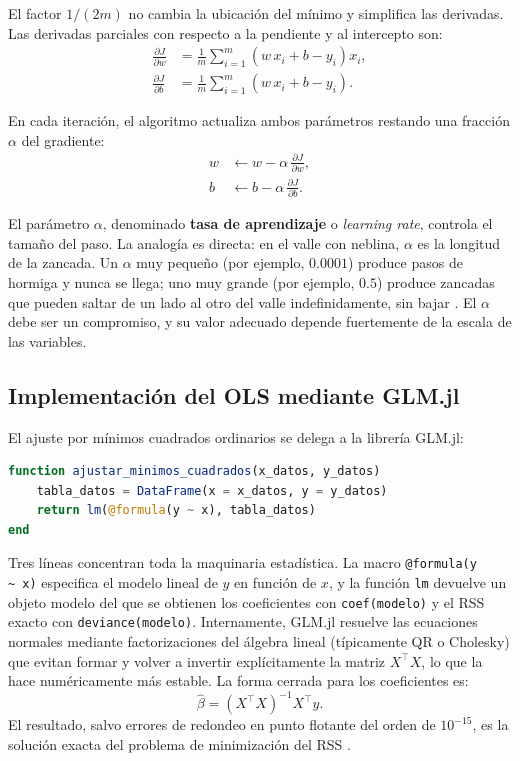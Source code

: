 \documentclass[11pt,a4paper]{article}
\begin{document}
El factor $1/(2m)$ no cambia la ubicación del mínimo y simplifica las derivadas. Las derivadas parciales con respecto a la pendiente y al intercepto son:
\begin{align}
\frac{\partial J}{\partial w} &= \frac{1}{m} \sum_{i=1}^{m} \left( w\,x_i + b - y_i \right) x_i, \\
\frac{\partial J}{\partial b} &= \frac{1}{m} \sum_{i=1}^{m} \left( w\,x_i + b - y_i \right).
\end{align}

En cada iteración, el algoritmo actualiza ambos parámetros restando una fracción $\alpha$ del gradiente:
\begin{align}
w &\leftarrow w - \alpha\,\frac{\partial J}{\partial w}, \\
b &\leftarrow b - \alpha\,\frac{\partial J}{\partial b}.
\end{align}

El parámetro $\alpha$, denominado \textbf{tasa de aprendizaje} o \textit{learning rate}, controla el tamaño del paso. La analogía es directa: en el valle con neblina, $\alpha$ es la longitud de la zancada. Un $\alpha$ muy pequeño (por ejemplo, $0.0001$) produce pasos de hormiga y nunca se llega; uno muy grande (por ejemplo, $0.5$) produce zancadas que pueden saltar de un lado al otro del valle indefinidamente, sin bajar \cite{codificando_lineal,ibm_gd}. El $\alpha$ debe ser un compromiso, y su valor adecuado depende fuertemente de la escala de las variables.

\subsection{Implementación del OLS mediante GLM.jl}

El ajuste por mínimos cuadrados ordinarios se delega a la librería GLM.jl:

\begin{lstlisting}[language=Julia,caption={Ajuste OLS mediante la macro @formula y la función lm de GLM.jl.}]
function ajustar_minimos_cuadrados(x_datos, y_datos)
    tabla_datos = DataFrame(x = x_datos, y = y_datos)
    return lm(@formula(y ~ x), tabla_datos)
end
\end{lstlisting}

Tres líneas concentran toda la maquinaria estadística. La macro \texttt{@formula(y \textasciitilde\ x)} especifica el modelo lineal de $y$ en función de $x$, y la función \texttt{lm} devuelve un objeto modelo del que se obtienen los coeficientes con \texttt{coef(modelo)} y el RSS exacto con \texttt{deviance(modelo)}. Internamente, GLM.jl resuelve las ecuaciones normales mediante factorizaciones del álgebra lineal (típicamente QR o Cholesky) que evitan formar y volver a invertir explícitamente la matriz $X^{\top}X$, lo que la hace numéricamente más estable. La forma cerrada para los coeficientes es:
\begin{equation}
\hat{\beta} = (X^{\top}X)^{-1} X^{\top} y.
\end{equation}
El resultado, salvo errores de redondeo en punto flotante del orden de $10^{-15}$, es la solución exacta del problema de minimización del RSS \cite{wiki_mco,cds_mco,esri_ols}.
\end{document}
